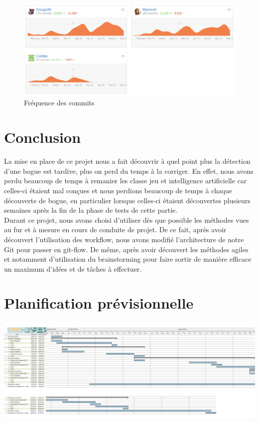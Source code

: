 \documentclass{report}
\begin{document}
\begin{figure}[H]
\begin{center}
	\includegraphics[scale=0.4]{./courbesCommits.png}
	\caption{Fréquence des commits}
\end{center}
\end{figure}





\chapter{Conclusion}

\hspace{0.5cm}La mise en place de ce projet nous a fait découvrir à quel point plus la détection d'une bogue est tardive, plus on perd du temps à la corriger. En effet, nous avons perdu beaucoup de temps à remanier les classe jeu et intelligence artificielle car celles-ci étaient mal conçues et nous perdions beaucoup de temps à chaque découverte de bogue, en particulier lorsque celles-ci étaient découvertes plusieurs semaines après la fin de la phase de tests de cette partie. \\

Durant ce projet, nous avons choisi d'utiliser dès que possible les méthodes vues au fur et à mesure en cours de conduite de projet. De ce fait, après avoir découvert l'utilisation des workflow, nous avons modifié l'architecture de notre Git pour passer en git-flow. De même, après avoir découvert les méthodes agiles et notamment d'utilisation du brainstorming pour faire sortir de manière efficace un maximum d'idées et de tâches à effectuer. \par

\appendix
\chapter{Planification prévisionnelle}
		 \hspace{-2.5cm} 
			\includegraphics[scale=0.28]{../DiagrammePrevisionnel.png}
	\medskip
\end{document}
